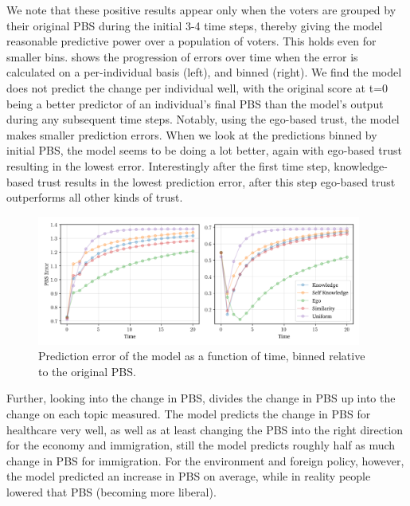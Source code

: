 We note that these positive results appear only when the voters are grouped by
their original PBS during the initial 3-4 time steps, thereby giving the model
reasonable predictive power over a population of voters.  This holds even for
smaller bins.  shows the progression of errors over
time when the error is calculated on a per-individual basis (left), and binned
(right). We find the model does not predict the change per individual well,
with the original score at t=0 being a better predictor of an individual's final
PBS than the model's output during any subsequent time steps. Notably, using the ego-based trust, the model makes
smaller prediction errors. When we look at the predictions binned by initial
PBS, the model seems to be doing a lot better, again with ego-based trust
resulting in the lowest error. Interestingly after the first time step,
knowledge-based trust results in the lowest prediction error, after this step
ego-based trust outperforms all other kinds of trust.


\begin{figure}[ht]
	\begin{center}
		\includegraphics[width=0.95\textwidth]{Figures/errors_binned.png}
	\end{center}
	\caption{Prediction error of the model as a function of time, binned relative to the original  PBS.}\label{fig:binned_errors}
\end{figure}


Further, looking into the change in PBS,  divides the
change in PBS up into the change on each topic measured. The model predicts the
change in PBS for healthcare very well, as well as at least changing the PBS
into the right direction for the economy and immigration, still the model
predicts roughly half as much change in PBS for immigration. For the
environment and foreign policy, however, the model predicted an increase in PBS
on average, while in reality people lowered that PBS (becoming more liberal).


